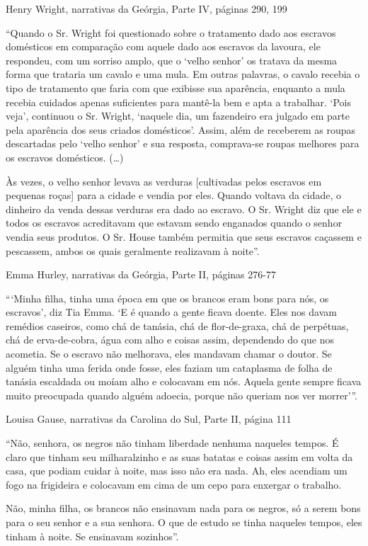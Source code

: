 Henry Wright, narrativas da Geórgia, Parte IV, páginas 290, 199

``Quando o Sr. Wright foi questionado sobre o tratamento dado aos
escravos domésticos em comparação com aquele dado aos escravos da
lavoura, ele respondeu, com um sorriso amplo, que o `velho senhor' os
tratava da mesma forma que trataria um cavalo e uma mula. Em outras
palavras, o cavalo recebia o tipo de tratamento que faria com que
exibisse sua aparência, enquanto a mula recebia cuidados apenas
suficientes para mantê-la bem e apta a trabalhar. `Pois veja', continuou
o Sr. Wright, `naquele dia, um fazendeiro era julgado em parte pela
aparência dos seus criados domésticos'. Assim, além de receberem as
roupas descartadas pelo `velho senhor' e sua resposta, comprava-se
roupas melhores para os escravos domésticos. (\ldots{})

Às vezes, o velho senhor levava as verduras {[}cultivadas pelos escravos
em pequenas roças{]} para a cidade e vendia por eles. Quando voltava da
cidade, o dinheiro da venda dessas verduras era dado ao escravo. O Sr.
Wright diz que ele e todos os escravos acreditavam que estavam sendo
enganados quando o senhor vendia seus produtos. O Sr. House também
permitia que seus escravos caçassem e pescassem, ambos os quais
geralmente realizavam à noite''.

Emma Hurley, narrativas da Geórgia, Parte II, páginas 276-77

```Minha filha, tinha uma época em que os brancos eram bons para nós, os
escravos', diz Tia Emma. `E é quando a gente ficava doente. Eles nos
davam remédios caseiros, como chá de tanásia, chá de flor-de-graxa, chá
de perpétuas, chá de erva-de-cobra, água com alho e coisas assim,
dependendo do que nos acometia. Se o escravo não melhorava, eles
mandavam chamar o doutor. Se alguém tinha uma ferida onde fosse, eles
faziam um cataplasma de folha de tanásia escaldada ou moíam alho e
colocavam em nós. Aquela gente sempre ficava muito preocupada quando
alguém adoecia, porque não queriam nos ver morrer'''.

Louisa Gause, narrativas da Carolina do Sul, Parte II, página 111

``Não, senhora, os negros não tinham liberdade nenhuma naqueles tempos.
É claro que tinham seu milharalzinho e as suas batatas e coisas assim em
volta da casa, que podiam cuidar à noite, mas isso não era nada. Ah,
eles acendiam um fogo na frigideira e colocavam em cima de um cepo para
enxergar o trabalho.

Não, minha filha, os brancos não ensinavam nada para os negros, só a
serem bons para o seu senhor e a sua senhora. O que de estudo se tinha
naqueles tempos, eles tinham à noite. Se ensinavam sozinhos''.

